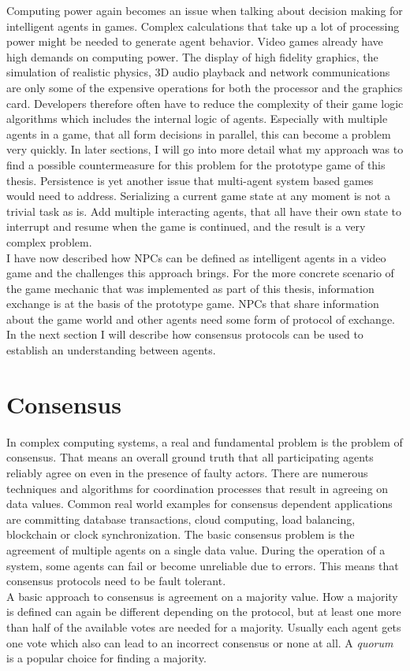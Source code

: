 Computing power again becomes an issue when talking about decision making for intelligent agents in games. Complex calculations that take up a lot of processing power might be needed to generate agent behavior. Video games already have high demands on computing power. The display of high fidelity graphics, the simulation of realistic physics, 3D audio playback and network communications are only some of the expensive operations for both the processor and the graphics card. Developers therefore often have to reduce the complexity of their game logic algorithms which includes the internal logic of agents. Especially with multiple agents in a game, that all form decisions in parallel, this can become a problem very quickly. In later sections, I will go into more detail what my approach was to find a possible countermeasure for this problem for the prototype game of this thesis. Persistence is yet another issue that multi-agent system based games would need to address. Serializing a current game state at any moment is not a trivial task as is. Add multiple interacting agents, that all have their own state to interrupt and resume when the game is continued, and the result is a very complex problem.~\cite{Dignum2009}\\
I have now described how NPCs can be defined as intelligent agents in a video game and the challenges this approach brings. For the more concrete scenario of the game mechanic that was implemented as part of this thesis, information exchange is at the basis of the prototype game. NPCs that share information about the game world and other agents need some form of protocol of exchange. In the next section I will describe how consensus protocols can be used to establish an understanding between agents.
\section{Consensus}
In complex computing systems, a real and fundamental problem is the problem of consensus. That means an overall ground truth that all participating agents reliably agree on even in the presence of faulty actors. There are numerous techniques and algorithms for coordination processes that result in agreeing on data values. Common real world examples for consensus dependent applications are committing database transactions, cloud computing, load balancing, blockchain or clock synchronization. The basic consensus problem is the agreement of multiple agents on a single data value. During the operation of a system, some agents can fail or become unreliable due to errors. This means that consensus protocols need to be fault tolerant.~\cite{Van2002}\\
A basic approach to consensus is agreement on a majority value. How a majority is defined can again be different depending on the protocol, but at least one more than half of the available votes are needed for a majority. Usually each agent gets one vote which also can lead to an incorrect consensus or none at all. A \textit{quorum} is a popular choice for finding a majority.
